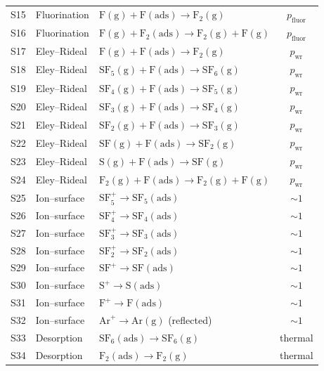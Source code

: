 \documentclass[11pt,a4paper]{report}
\newcommand{\SFsix}{\mathrm{SF}_6}
\newcommand{\SFfive}{\mathrm{SF}_5}
\newcommand{\SFfour}{\mathrm{SF}_4}
\newcommand{\SFthree}{\mathrm{SF}_3}
\newcommand{\Ar}{\mathrm{Ar}}
\begin{document}
\begin{longtable}{@{}clp{5.5cm}c@{}}
S15 & Fluorination & $\mathrm{F(g)} + \mathrm{F(ads)} \to \mathrm{F_2(g)}$              & $p_\mathrm{fluor}$ \\
S16 & Fluorination & $\mathrm{F(g)} + \mathrm{F_2(ads)} \to \mathrm{F_2(g)} + \mathrm{F(g)}$ & $p_\mathrm{fluor}$ \\
\midrule
S17 & Eley--Rideal & $\mathrm{F(g)} + \mathrm{F(ads)} \to \mathrm{F_2(g)}$         & $p_\mathrm{wr}$ \\
S18 & Eley--Rideal & $\SFfive\mathrm{(g)} + \mathrm{F(ads)} \to \SFsix\mathrm{(g)}$ & $p_\mathrm{wr}$ \\
S19 & Eley--Rideal & $\SFfour\mathrm{(g)} + \mathrm{F(ads)} \to \SFfive\mathrm{(g)}$ & $p_\mathrm{wr}$ \\
S20 & Eley--Rideal & $\SFthree\mathrm{(g)} + \mathrm{F(ads)} \to \SFfour\mathrm{(g)}$ & $p_\mathrm{wr}$ \\
S21 & Eley--Rideal & $\mathrm{SF_2(g)} + \mathrm{F(ads)} \to \SFthree\mathrm{(g)}$ & $p_\mathrm{wr}$ \\
S22 & Eley--Rideal & $\mathrm{SF(g)} + \mathrm{F(ads)} \to \mathrm{SF_2(g)}$       & $p_\mathrm{wr}$ \\
S23 & Eley--Rideal & $\mathrm{S(g)} + \mathrm{F(ads)} \to \mathrm{SF(g)}$          & $p_\mathrm{wr}$ \\
S24 & Eley--Rideal & $\mathrm{F_2(g)} + \mathrm{F(ads)} \to \mathrm{F_2(g)} + \mathrm{F(g)}$ & $p_\mathrm{wr}$ \\
\midrule
S25 & Ion--surface & $\SFfive^+ \to \SFfive\mathrm{(ads)}$ & $\sim1$ \\
S26 & Ion--surface & $\SFfour^+ \to \SFfour\mathrm{(ads)}$ & $\sim1$ \\
S27 & Ion--surface & $\SFthree^+ \to \SFthree\mathrm{(ads)}$ & $\sim1$ \\
S28 & Ion--surface & $\mathrm{SF_2^+} \to \mathrm{SF_2(ads)}$ & $\sim1$ \\
S29 & Ion--surface & $\mathrm{SF^+} \to \mathrm{SF(ads)}$ & $\sim1$ \\
S30 & Ion--surface & $\mathrm{S^+} \to \mathrm{S(ads)}$ & $\sim1$ \\
S31 & Ion--surface & $\mathrm{F^+} \to \mathrm{F(ads)}$ & $\sim1$ \\
S32 & Ion--surface & $\Ar^+ \to \Ar\mathrm{(g)}$ (reflected) & $\sim1$ \\
\midrule
S33 & Desorption & $\SFsix\mathrm{(ads)} \to \SFsix\mathrm{(g)}$ & thermal \\
S34 & Desorption & $\mathrm{F_2(ads)} \to \mathrm{F_2(g)}$ & thermal \\

\end{longtable}
\end{document}
